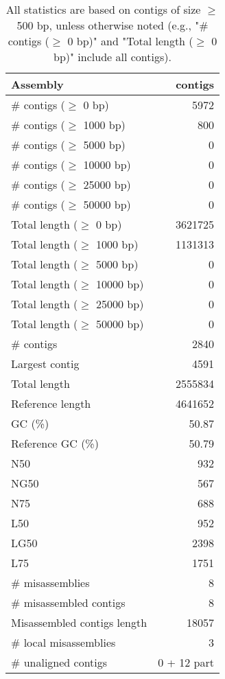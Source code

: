 \documentclass[12pt,a4paper]{article}
\begin{document}
\begin{table}[ht]
\begin{center}
\caption{All statistics are based on contigs of size $\geq$ 500 bp, unless otherwise noted (e.g., "\# contigs ($\geq$ 0 bp)" and "Total length ($\geq$ 0 bp)" include all contigs).}
\begin{tabular}{|l*{1}{|r}|}
\hline
Assembly & contigs \\ \hline
\# contigs ($\geq$ 0 bp) & 5972 \\ \hline
\# contigs ($\geq$ 1000 bp) & 800 \\ \hline
\# contigs ($\geq$ 5000 bp) & 0 \\ \hline
\# contigs ($\geq$ 10000 bp) & 0 \\ \hline
\# contigs ($\geq$ 25000 bp) & 0 \\ \hline
\# contigs ($\geq$ 50000 bp) & 0 \\ \hline
Total length ($\geq$ 0 bp) & 3621725 \\ \hline
Total length ($\geq$ 1000 bp) & 1131313 \\ \hline
Total length ($\geq$ 5000 bp) & 0 \\ \hline
Total length ($\geq$ 10000 bp) & 0 \\ \hline
Total length ($\geq$ 25000 bp) & 0 \\ \hline
Total length ($\geq$ 50000 bp) & 0 \\ \hline
\# contigs & 2840 \\ \hline
Largest contig & 4591 \\ \hline
Total length & 2555834 \\ \hline
Reference length & 4641652 \\ \hline
GC (\%) & 50.87 \\ \hline
Reference GC (\%) & 50.79 \\ \hline
N50 & 932 \\ \hline
NG50 & 567 \\ \hline
N75 & 688 \\ \hline
L50 & 952 \\ \hline
LG50 & 2398 \\ \hline
L75 & 1751 \\ \hline
\# misassemblies & 8 \\ \hline
\# misassembled contigs & 8 \\ \hline
Misassembled contigs length & 18057 \\ \hline
\# local misassemblies & 3 \\ \hline
\# unaligned contigs & 0 + 12 part \\ \hline

\end{tabular}
\end{center}
\end{table}
\end{document}

